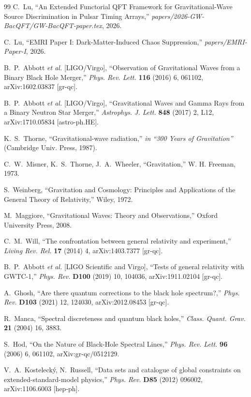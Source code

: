 \documentclass[11pt]{article}
\begin{document}
\begin{thebibliography}{99}
 C.~Lu, ``An Extended Functorial QFT Framework for Gravitational-Wave Source Discrimination in Pulsar Timing Arrays,'' \textit{papers/2026-GW-BacQFT/GW-BacQFT-paper.tex}, 2026.

 C.~Lu, ``EMRI Paper I: Dark-Matter-Induced Chaos Suppression,'' \textit{papers/EMRI-Paper-I}, 2026.

 B.~P.~Abbott \textit{et al.} [LIGO/Virgo], ``Observation of Gravitational Waves from a Binary Black Hole Merger,'' \textit{Phys. Rev. Lett.} \textbf{116} (2016) 6, 061102, arXiv:1602.03837 [gr-qc].

 B.~P.~Abbott \textit{et al.} [LIGO/Virgo], ``Gravitational Waves and Gamma Rays from a Binary Neutron Star Merger,'' \textit{Astrophys. J. Lett.} \textbf{848} (2017) 2, L12, arXiv:1710.05834 [astro-ph.HE].

 K.~S.~Thorne, ``Gravitational-wave radiation,'' \textit{in ``300 Years of Gravitation''} (Cambridge Univ. Press, 1987).

 C.~W.~Misner, K.~S.~Thorne, J.~A.~Wheeler, ``Gravitation,'' W. H. Freeman, 1973.

 S.~Weinberg, ``Gravitation and Cosmology: Principles and Applications of the General Theory of Relativity,'' Wiley, 1972.

 M.~Maggiore, ``Gravitational Waves: Theory and Observations,'' Oxford University Press, 2008.

 C.~M.~Will, ``The confrontation between general relativity and experiment,'' \textit{Living Rev. Rel.} \textbf{17} (2014) 4, arXiv:1403.7377 [gr-qc].

 B.~P.~Abbott \textit{et al.} [LIGO Scientific and Virgo], ``Tests of general relativity with GWTC-1,'' \textit{Phys. Rev.} \textbf{D100} (2019) 10, 104036, arXiv:1911.02104 [gr-qc].

 A.~Ghosh, ``Are there quantum corrections to the black hole spectrum?,'' \textit{Phys. Rev.} \textbf{D103} (2021) 12, 124030, arXiv:2012.08453 [gr-qc].

 R.~Manca, ``Spectral discreteness and quantum black holes,'' \textit{Class. Quant. Grav.} \textbf{21} (2004) 16, 3883.

 S.~Hod, ``On the Nature of Black-Hole Spectral Lines,'' \textit{Phys. Rev. Lett.} \textbf{96} (2006) 6, 061102, arXiv:gr-qc/0512129.

 V.~A.~Kosteleck\'y, N.~Russell, ``Data sets and catalogue of global constraints on extended-standard-model physics,'' \textit{Phys. Rev.} \textbf{D85} (2012) 096002, arXiv:1106.6003 [hep-ph].

\end{thebibliography}
\end{document}
